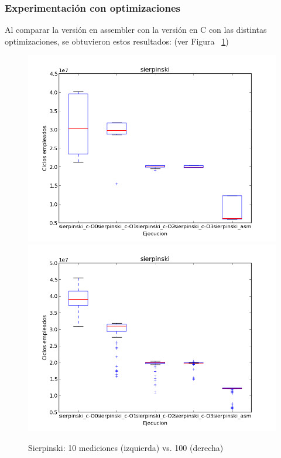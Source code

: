 \documentclass[a4paper]{article}
\begin{document}
\subsubsection{Experimentación con optimizaciones}

Al comparar la versión en assembler con la versión en C con las distintas optimizaciones, se obtuvieron estos resultados: (ver Figura ~\ref{fig:graficos_sierpinski})

\begin{figure}[htbp]
\centering
\includegraphics[scale=0.33]{imagenes/tiempossierpinski.png}
\includegraphics[scale=0.33]{imagenes/tiempossierpinski100.png}
\caption{Sierpinski: 10 mediciones (izquierda) vs. 100 (derecha)}
\label{fig:graficos_sierpinski}
\end{figure}
\end{document}

